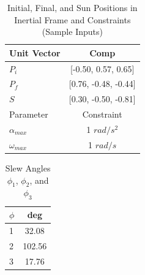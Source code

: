 \documentclass[letterpaper, preprint, paper,11pt]{AAS}	%
\begin{document}
		\begin{multicols}{2}
			\begin{table}[H]
				\centering
				\caption{Initial, Final, and Sun Positions in Inertial Frame and Constraints (Sample Inputs)}
				\begin{tabular}{lc}
					\toprule
					\midrule
					Unit Vector & Comp \\
					\midrule
					$P_i$ & [-0.50, 0.57, 0.65] \\
					$P_f$ & [0.76, -0.48, -0.44] \\ 
					$S$ & [0.30, -0.50, -0.81] \\
					\midrule
					\midrule
					Parameter & Constraint \\ 
					\midrule
					$\alpha_{max}$ & 1 $rad/s^2$ \\
					$\omega_{max}$ & 1 $rad/s$ \\ 
					\midrule
					\bottomrule
				\end{tabular}%
				\label{tab:alphaNot0_PiPfS_AWmax}%
			\end{table}
			\columnbreak
			\begin{table}[H]
				\centering
				\caption{Slew Angles $\phi_1$, $\phi_2$, and $\phi_3$}
				\begin{tabular}{lc}
					\toprule
					\midrule
					$\phi$ & deg \\
					\midrule
					1 & 32.08 \\
					2 & 102.56 \\ 
					3 & 17.76 \\
					\midrule
					\bottomrule
				\end{tabular}%
				\label{tab:alphaNot0_phi_123}%
			\end{table}%
		\end{multicols}
		
		
			
\end{document}
